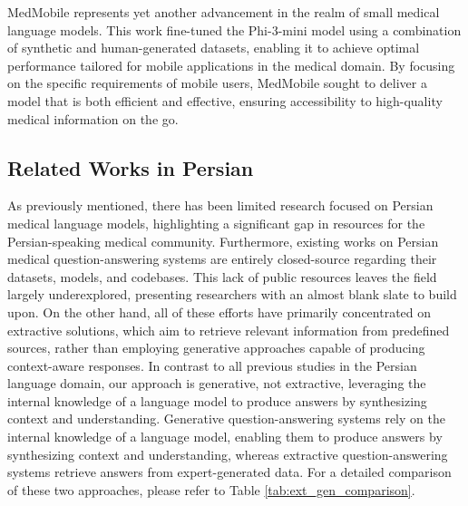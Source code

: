 \documentclass[conference]{IEEEtran}
\begin{document}
	MedMobile
	\cite{b10}
	represents yet another advancement in the realm of small medical language models. This work fine-tuned the Phi-3-mini model
	\cite{b11}
	using a combination of synthetic and human-generated datasets, enabling it to achieve optimal performance tailored for mobile applications in the medical domain. By focusing on the specific requirements of mobile users, MedMobile sought to deliver a model that is both efficient and effective, ensuring accessibility to high-quality medical information on the go.
	\subsection{Related Works in Persian}
As previously mentioned, there has been limited research focused on Persian medical language models, highlighting a significant gap in resources for the Persian-speaking medical community. Furthermore, existing works on Persian medical question-answering systems are entirely closed-source regarding their datasets, models, and codebases. This lack of public resources leaves the field largely underexplored, presenting researchers with an almost blank slate to build upon. On the other hand, all of these efforts have primarily concentrated on extractive solutions, which aim to retrieve relevant information from predefined sources, rather than employing generative approaches capable of producing context-aware responses. In contrast to all previous studies in the Persian language domain, our approach is generative, not extractive, leveraging the internal knowledge of a language model to produce answers by synthesizing context and understanding. Generative question-answering systems rely on the internal knowledge of a language model, enabling them to produce answers by synthesizing context and understanding, whereas extractive question-answering systems retrieve answers from expert-generated data. For a detailed comparison of these two approaches, please refer to Table \ref{tab:ext_gen_comparison}.
\end{document}
